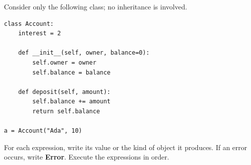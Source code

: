 \question Consider only the following class; no inheritance is involved.
\begin{lstlisting}
class Account:
    interest = 2

    def __init__(self, owner, balance=0):
        self.owner = owner
        self.balance = balance

    def deposit(self, amount):
        self.balance += amount
        return self.balance

a = Account("Ada", 10)
\end{lstlisting}

For each expression, write its value or the kind of object it produces. If an
error occurs, write \textbf{Error}. Execute the expressions in order.
